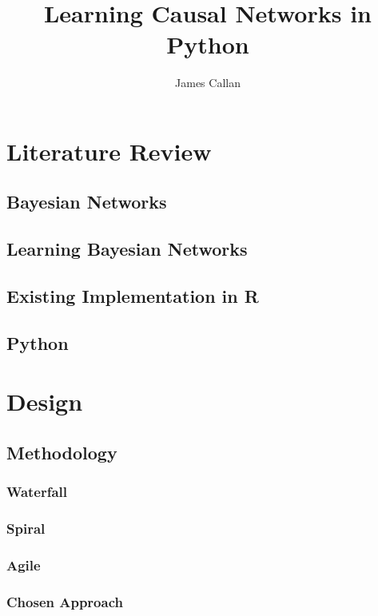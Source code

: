 \documentclass{article}
\begin{document}
\title{Learning Causal Networks in Python}
\author{James Callan}
\date{}

\maketitle

\newpage

\section{Literature Review}

\subsection{Bayesian Networks}

\subsection{Learning Bayesian Networks}

\subsection{Existing Implementation in R}

\subsection{Python}


\section{Design}

\subsection{Methodology}
\subsubsection{Waterfall}
\subsubsection{Spiral}
\subsubsection{Agile}
\subsubsection{Chosen Approach}
\end{document}

